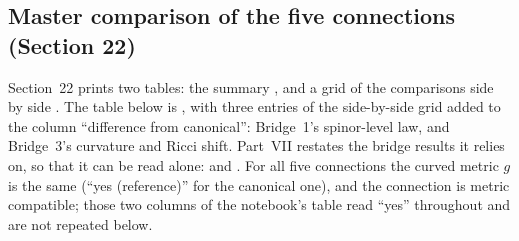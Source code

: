 \subsection{Master comparison of the five connections (Section 22)}
\label{csc:master}\label{sec:9.11}

Section~22 prints two tables: the summary , and a grid of the
comparisons side by side . The table below is ,
with three entries of the side-by-side grid added to the column ``difference from canonical'':
Bridge~1's spinor-level law, and Bridge~3's curvature and Ricci shift. Part~VII restates the bridge
results it relies on, so that it can be read alone:  
and . For all five connections
the curved metric $g$ is the same (``yes (reference)'' for the canonical one), and the connection
is metric compatible; those two columns of the notebook's table read ``yes'' throughout and are
not repeated below.

